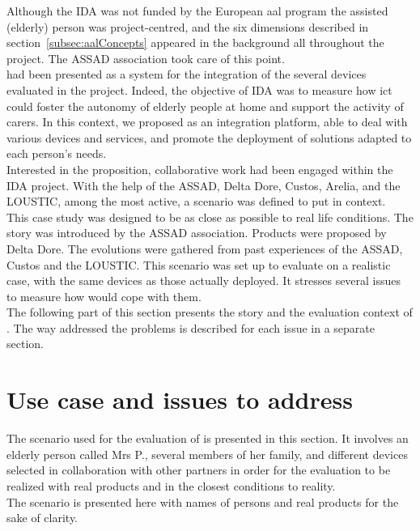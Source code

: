 Although the IDA was not funded by the European \gls{aal} program the assisted (elderly) person was project-centred, and the six dimensions described in section~\ref{subsec:aalConcepts} appeared in the background all throughout the project. The ASSAD association took care of this point.\\
\enti{} had been presented as a system for the integration of the several devices evaluated in the project. Indeed, the objective of IDA was to measure how \gls{ict} could foster the autonomy of elderly people at home and support the activity of carers. In this context, we proposed \enti{} as an integration platform, able to deal with various devices and services, and promote the deployment of solutions adapted to each person's needs.\\

Interested in the proposition, collaborative work had been engaged within the IDA project. With the help of the ASSAD, Delta Dore, Custos, Arelia, and the LOUSTIC, among the most active, a scenario was defined to put \enti{} in context.\\
This case study was designed to be as close as possible to real life conditions. The story was introduced by the ASSAD association. Products were proposed by Delta Dore. The evolutions were gathered from past experiences of the ASSAD, Custos and the LOUSTIC. This scenario was set up to evaluate \enti{} on a realistic case, with the same devices as those actually deployed. It stresses several issues to measure how \enti{} would cope with them.\\
The following part of this section presents the story and the evaluation context of \enti{}. The way \enti{} addressed the problems is described for each issue in a separate section.


\section{Use case and issues to address}
\label{sec:usecase}

The scenario used for the evaluation of \enti{} is presented in this section. It involves an elderly person called Mrs P., several members of her family, and different devices selected in collaboration with other partners in order for the evaluation to be realized with real products and in the closest conditions to reality.\\

The scenario is presented here with names of persons and real products for the sake of clarity.\\

